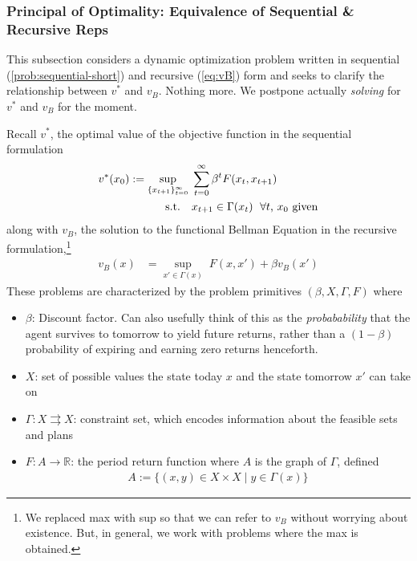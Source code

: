 \documentclass[12pt]{article}
\numberwithin{equation}{section} %
\theoremstyle{plain}
\theoremstyle{definition}
\theoremstyle{remark}
\newcommand{\ra}{\rightarrow}
\newcommand{\R}{\mathbb{R}}
\newcommand{\sumtinfz}{\sum^\infty_{t=0}}
\begin{document}
\clearpage
\subsubsection{Principal of Optimality: Equivalence of Sequential \&
Recursive Reps}

This subsection considers a dynamic optimization problem written in
sequential (\ref{prob:sequential-short}) and recursive (\ref{eq:vB}) form
and seeks to clarify the relationship between $v^*$ and $v_B$.
Nothing more. We postpone actually \emph{solving} for $v^*$ and $v_B$
for the moment.

Recall $v^*$, the optimal value of the objective function in the
sequential formulation
\begin{align}
  \label{eq:vstar}
  v^*(x_0) := \sup_{\{x_{t+1}\}_{t=0}^\infty}
  \; &\sumtinfz \beta^t F(x_t,x_{t+1})
  \\
  \qquad \text{s.t.}\quad
  &
  \text{$x_{t+1} \in \Gamma(x_t)$ $\;\forall t$, $x_0$ given}
  \notag
\end{align}
along with $v_B$, the solution to the functional Bellman Equation
in the recursive formulation,\footnote{%
  We replaced max with sup so that we can refer to $v_B$ without
  worrying about existence. But, in general, we work with problems where
  the max is obtained.
}
\begin{align}
  \label{eq:vB2}
  v_B(x) &=
  \sup_{x'\in\Gamma(x)}\;
  F(x,x') +
  \beta v_B(x')
\end{align}
These problems are characterized by the problem primitives
$(\beta,X,\Gamma,F)$ where
\begin{itemize}
  \item $\beta$: Discount factor. Can also usefully think of this as
    the \emph{probabability} that the agent survives to tomorrow to
    yield future returns, rather than a $(1-\beta)$ probability of
    expiring and earning zero returns henceforth.
  \item $X$: set of possible values the state today $x$ and the
    state tomorrow $x'$ can take on
  \item $\Gamma:X \rightrightarrows X$: constraint set, which encodes
    information about the feasible sets and plans
  \item $F:A\ra \R$: the period return function where $A$ is the
    graph of $\Gamma$, defined
    \begin{align*}
      A:=\{(x,y) \in X\times X \;|\; y \in\Gamma(x)\}
    \end{align*}
\end{itemize}
\end{document}
